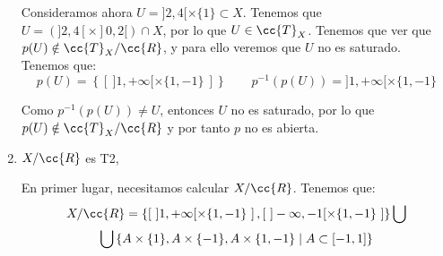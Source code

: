 \documentclass[12pt]{article}
\newcommand{\T}[0]{\cc{T}}
\begin{document}
\begin{ejercicio}[2.5 puntos]
\begin{enumerate}
            Consideramos ahora $U=]2,4[\times \{1\} \subset X$.
            Tenemos que $U=\left(]2,4[\times ]0,2[ \right)\cap X$,
            por lo que $U\in \T_X$. Tenemos que ver que $p(U)\notin \T_X/\cc{R}$, y para ello veremos que
            $U$ no es saturado. Tenemos que:
            \begin{equation*}
                p(U) = \left\{\left[~]1, +\infty[ \times \{1,-1\}~\right]\right\}
                \qquad
                p^{-1}(p(U)) = ]1, +\infty[ \times \{1,-1\}
            \end{equation*}

            Como $p^{-1}(p(U)) \neq U$, entonces $U$ no es saturado,
            por lo que $p(U)\notin \T_X/\cc{R}$ y por tanto $p$ no es abierta.

            \item $X/\cc{R}$ es T2,
            
            En primer lugar, necesitamos calcular $X/\cc{R}$. Tenemos que:
            \begin{multline*}
                X/\cc{R} =\left\{
                  \left[~]1, +\infty[ \times \{1,-1\}~\right],
                  \left[~]-\infty, -1[ \times \{1,-1\}~\right]
                \right\}
                \bigcup \\ \bigcup
                \left\{
                  A \times \{1\}, A \times \{-1\}, A \times \{1,-1\}
                  \mid
                  A\subset [-1,1]
                \right\}
            \end{multline*}
            
            \begin{comment}
            Además, tenemos que:
            \begin{multline*}
                \T/\cc{R} = \left\{
                  \left[~]1, +\infty[ \times \{1,-1\}~\right],
                  \left[~]-\infty, -1[ \times \{1,-1\}~\right]
                \right\}
                \bigcup \\ \bigcup
                \left\{
                  A \times \{1\}, A \times \{-1\}, A \times \{1,-1\}
                  \mid
                  A\in \T_{]-1,1[}
                \right\}
            \end{multline*}
            \end{comment}



\end{enumerate}
\end{ejercicio}
\end{document}
